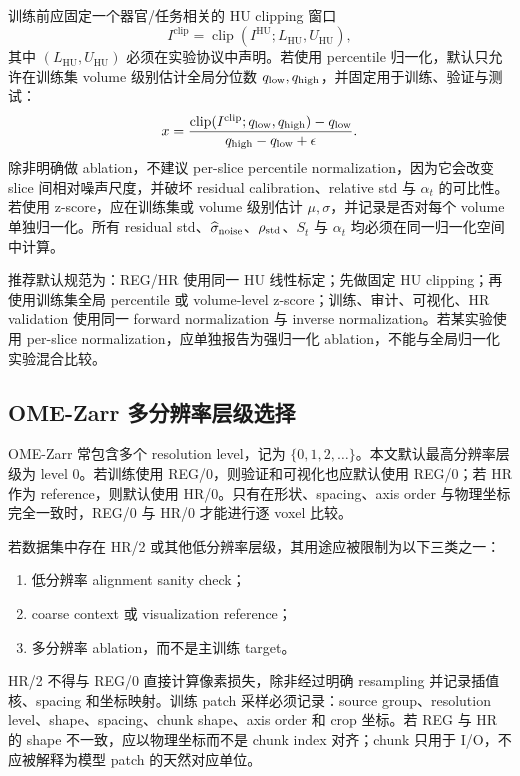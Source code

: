 \documentclass[11pt,a4paper,UTF8,fontset=fandol]{ctexart}
\theoremstyle{definition}
\DeclareMathOperator{\clip}{clip}
\begin{document}
训练前应固定一个器官/任务相关的 HU clipping 窗口
\begin{equation}
    I^{\mathrm{clip}}=\clip(I^{\mathrm{HU}};L_{\mathrm{HU}},U_{\mathrm{HU}}),
\end{equation}
其中 $(L_{\mathrm{HU}},U_{\mathrm{HU}})$ 必须在实验协议中声明。若使用 percentile 归一化，默认只允许在训练集 volume 级别估计全局分位数 $q_{\rm low},q_{\rm high}$，并固定用于训练、验证与测试：
\begin{equation}
    x=\frac{\clip(I^{\mathrm{clip}};q_{\rm low},q_{\rm high})-q_{\rm low}}
    {q_{\rm high}-q_{\rm low}+\epsilon}.
\end{equation}
除非明确做 ablation，不建议 per-slice percentile normalization，因为它会改变 slice 间相对噪声尺度，并破坏 residual calibration、relative std 与 $\alpha_t$ 的可比性。若使用 z-score，应在训练集或 volume 级别估计 $\mu,\sigma$，并记录是否对每个 volume 单独归一化。所有 residual std、$\widehat\sigma_{\rm noise}$、$\rho_{\rm std}$、$S_t$ 与 $\alpha_t$ 均必须在同一归一化空间中计算。

推荐默认规范为：REG/HR 使用同一 HU 线性标定；先做固定 HU clipping；再使用训练集全局 percentile 或 volume-level z-score；训练、审计、可视化、HR validation 使用同一 forward normalization 与 inverse normalization。若某实验使用 per-slice normalization，应单独报告为强归一化 ablation，不能与全局归一化实验混合比较。

\subsection{OME-Zarr 多分辨率层级选择}
\label{subsec:zarr-resolution-protocol}

OME-Zarr 常包含多个 resolution level，记为 $\{0,1,2,\ldots\}$。本文默认最高分辨率层级为 level 0。若训练使用 REG/0，则验证和可视化也应默认使用 REG/0；若 HR 作为 reference，则默认使用 HR/0。只有在形状、spacing、axis order 与物理坐标完全一致时，REG/0 与 HR/0 才能进行逐 voxel 比较。

若数据集中存在 HR/2 或其他低分辨率层级，其用途应被限制为以下三类之一：
\begin{enumerate}[leftmargin=2em]
    \item 低分辨率 alignment sanity check；
    \item coarse context 或 visualization reference；
    \item 多分辨率 ablation，而不是主训练 target。
\end{enumerate}
HR/2 不得与 REG/0 直接计算像素损失，除非经过明确 resampling 并记录插值核、spacing 和坐标映射。训练 patch 采样必须记录：source group、resolution level、shape、spacing、chunk shape、axis order 和 crop 坐标。若 REG 与 HR 的 shape 不一致，应以物理坐标而不是 chunk index 对齐；chunk 只用于 I/O，不应被解释为模型 patch 的天然对应单位。
\end{document}
